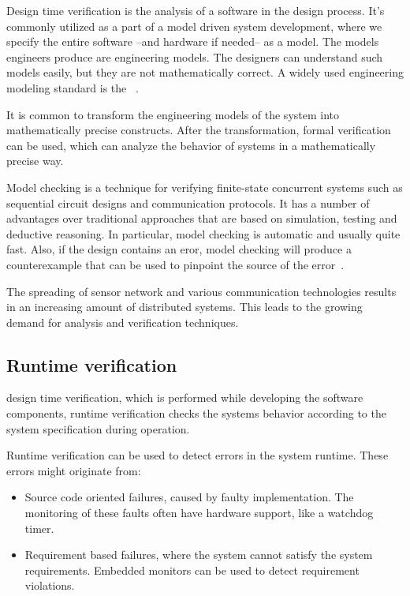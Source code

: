 Design time verification is the analysis of a software in the design process. It's commonly utilized as a part of a model driven system development, where we specify the entire software --and hardware if needed-- as a model.
The models engineers produce are engineering models. The designers can understand such models easily, but they are not mathematically correct. A widely used engineering modeling standard is the \uml{}~\cite{UML}.

It is common to transform the engineering models of the system into mathematically precise constructs. After the transformation, formal verification can be used, which can analyze the behavior of systems in a mathematically precise way.

Model checking is a technique for verifying finite-state concurrent systems such as sequential circuit designs and communication protocols. It has a number of advantages over traditional approaches that are based on simulation, testing and deductive reasoning. In particular, model checking is automatic and usually quite fast. Also, if the design contains an eror, model checking will produce a counterexample that can be used to pinpoint the source of the error~\cite{mcmillan1993symbolic}.

The spreading of sensor network and various communication technologies results in an increasing amount of distributed systems. This leads to the growing demand for analysis and verification techniques.

\subsection{Runtime verification}

 design time verification, which is performed while developing the software components, runtime verification checks the systems behavior according to the system specification during operation.

Runtime verification can be used to detect errors in the system runtime. These errors might originate from:
\begin{itemize}
	\item Source code oriented failures, caused by faulty implementation. The monitoring of these faults often have hardware support, like a watchdog timer.
	\item Requirement based failures, where the system cannot satisfy the system requirements. Embedded monitors can be used to detect requirement violations.
\end{itemize}

